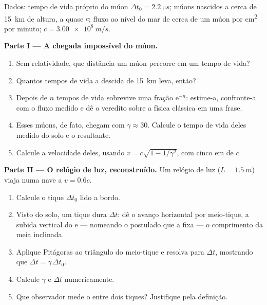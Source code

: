 \begin{problem}
\label{pb:g12:special-relativity:1}
Dados: tempo de vida próprio do múon $\Delta t_0 = \qty{2.2}{\micro s}$; múons nascidos a
cerca de \qty{15}{km} de altura, a quase $c$; fluxo ao nível do mar de cerca de um múon
por \unit{cm^2} por minuto; $c = \qty{3.00e8}{m/s}$.

\medskip
\noindent\textbf{Parte I --- A chegada impossível do múon.}
\begin{enumerate}
  \item Sem relatividade, que distância um múon percorre em um tempo de vida?
  \item Quantos tempos de vida a descida de \qty{15}{km} leva, então?
  \item Depois de $n$ tempos de vida sobrevive uma fração $\mathrm{e}^{-n}$: estime-a,
        confronte-a com o fluxo medido e dê o veredito sobre a física clássica em uma
        frase.
  \item Esses múons, de fato, chegam com $\gamma \approx 30$. Calcule o tempo de vida
        deles medido do solo e o  resultante.
  \item Calcule a velocidade deles, usando $v = c\sqrt{1 - 1/\gamma^2}$, com cinco
         em  de $c$.
\end{enumerate}

\medskip
\noindent\textbf{Parte II --- O relógio de luz, reconstruído.}
Um relógio de luz ($L = \qty{1.5}{m}$) viaja numa nave a $v = 0.6c$.
\begin{enumerate}[resume]
  \item Calcule o tique $\Delta t_0$ lido a bordo.
  \item Visto do solo, um tique dura $\Delta t$: dê o avanço horizontal por meio-tique, a
        subida vertical do  e --- nomeando o postulado que a fixa --- o comprimento
        da meia  inclinada.
  \item Aplique Pitágoras ao triângulo do meio-tique e resolva para $\Delta t$, mostrando
        que $\Delta t = \gamma\,\Delta t_0$.
  \item Calcule $\gamma$ e $\Delta t$ numericamente.
  \item Que observador mede o  entre dois tiques? Justifique pela definição.
\end{enumerate}


\end{problem}
